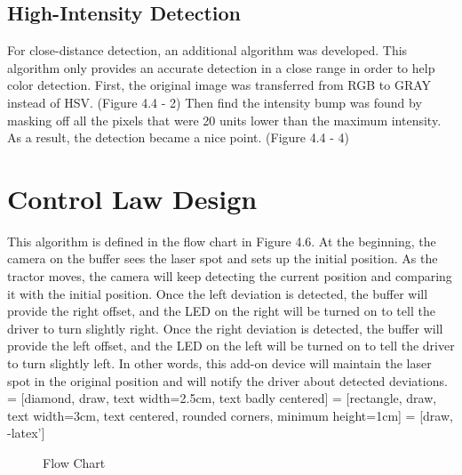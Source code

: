 \subsection{High-Intensity Detection}

For close-distance detection, an additional algorithm was developed. This algorithm only  provides an accurate detection in a close range in order to help color detection. First, the original image was transferred from RGB to GRAY instead of HSV. (Figure 4.4 - 2) Then find the intensity bump was found by masking off all the pixels that were 20 units lower than the maximum intensity. As a result, the detection became a nice point. (Figure 4.4 - 4)

\section{Control Law Design}
This algorithm is defined in the flow chart in Figure 4.6. At the beginning, the camera on the buffer sees the laser spot and sets up the initial position. As the tractor moves, the camera will keep detecting the current position and comparing it with the initial position. Once the left deviation is detected, the buffer will provide the right offset, and the LED on the right will be turned on to tell the driver to turn slightly right. Once the right deviation is detected, the buffer will provide the left offset, and the LED on the left will be turned on to tell the driver to turn slightly left.  In other words, this add-on device will maintain the laser spot in the original position and will notify the driver about detected deviations. 
 = [diamond, draw, text width=2.5cm, text badly centered]
 = [rectangle, draw, text width=3cm, text centered, rounded corners, minimum height=1cm]
 = [draw, -latex']
\begin{figure}[ht!]
\begin{center}
\caption{Flow Chart}
\end{center}
\end{figure}